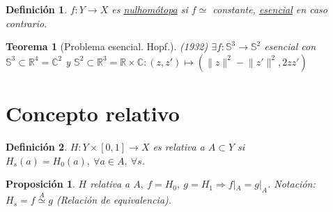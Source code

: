 \documentclass[10pt,a4paper,openright]{book}
\theoremstyle{break}
\newtheorem*{defi}{Definición}
\newtheorem*{theo}{Teorema}
\newtheorem*{prop}{Proposición}
\begin{document}
\begin{defi}
$f: Y \rightarrow X$ es \underline{nulhomótopa} si $f \simeq $ constante, \underline{esencial} en caso contrario.
\end{defi}

\begin{theo}[Problema esencial. Hopf.]
(1932) $\exists f : \mathbb{S}^3 \rightarrow \mathbb{S}^2$ esencial con $\mathbb{S}^3 \subset \mathbb{R}^4 = \mathbb{C}^2$ y $\mathbb{S}^2 \subset \mathbb{R}^3 = \mathbb{R} \times \mathbb{C}: \left( z, z' \right) \mapsto \left( \lVert z \rVert^2 - \lVert z' \rVert^2, 2 z z'\right) $ 
\end{theo}

\section{Concepto relativo}%
\label{sec:concepto_relativo}
\begin{defi}
$H: Y \times \left[ 0, 1 \right] \rightarrow X$ es relativa a $A \subset Y$ si $H_s\left( a \right) = H_0\left( a \right),\ \forall a \in A,\ \forall s$.
\end{defi}

\begin{prop}
$H$ relativa a $A,\ f = H_0,\ g = H_1 \Rightarrow f|_A = g|_A$. Notación: $H_s = f \stackrel{A}{\simeq} g$ (Relación de equivalencia).
\end{prop}
\end{document}
